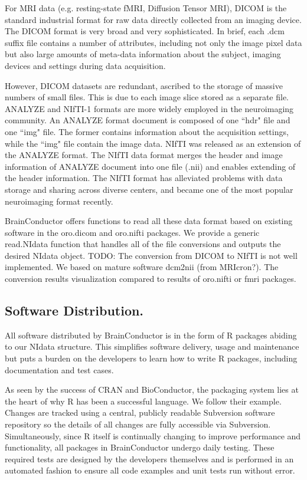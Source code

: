\documentclass{nature}
\begin{document}
For MRI data (e.g. resting-state fMRI, Diffusion Tensor MRI),
DICOM is the standard industrial
format for raw data directly collected from an imaging device. The DICOM format
is very broad and very sophisticated. In brief, each .dcm suffix file contains a
number of attributes, including not only the image pixel data but also large
amounts of meta-data information about the subject, imaging devices and settings
during data acquisition.  

However, DICOM datasets are redundant, ascribed to the storage of massive
numbers of small files. This is due to each image slice stored as a separate
file. ANALYZE and NIfTI-1 formats are more widely employed in the neuroimaging
community. An ANALYZE format document is composed of one ``hdr" file and one
``img" file. The former contains information about the acquisition settings,
while the ``img" file contain the image data. NIfTI was released as an extension
of the ANALYZE format. The NIfTI data format merges the header and image
information of ANALYZE document into one file (.nii) and enables extending of
the header information. The NIfTI format has alleviated problems with data
storage and sharing across diverse centers, and became one of the most popular
neuroimaging format recently. 

BrainConductor offers functions to read all these data format
based on existing software in the oro.dicom and oro.nifti packages. We
provide a generic read.NIdata function that handles all of the file 
conversions and outputs the desired NIdata object.
{\color{red} TODO: The conversion from DICOM to NIfTI is not well implemented. We based on mature
software dcm2nii (from MRIcron?). The conversion results visualization compared to results of
oro.nifti or fmri packages.}

\subsection{Software Distribution.}

All software distributed by BrainConductor is in the form of R packages abiding
to our NIdata structure. This 
simplifies software delivery, usage and maintenance but puts a burden on the developers
to learn how to write R packages, including documentation and test cases.

As seen by the success of CRAN and BioConductor, the packaging system lies
at the heart of why R has been a successful language. We follow their example.
Changes are tracked using a central, publicly readable Subversion software repository
so the details of all changes are fully accessible via Subversion. Simultaneously, since
R itself is continually changing to improve performance and functionality, all packages
in BrainConductor undergo daily testing. These required tests are designed by the 
developers themselves and is performed in an automated fashion to ensure
all code examples and unit tests run without error.
\end{document}
